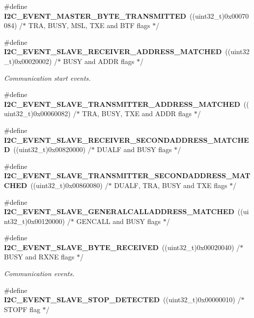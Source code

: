 \begin{DoxyCompactItemize}
\item 
\#define \textbf{ I2\+C\+\_\+\+E\+V\+E\+N\+T\+\_\+\+M\+A\+S\+T\+E\+R\+\_\+\+B\+Y\+T\+E\+\_\+\+T\+R\+A\+N\+S\+M\+I\+T\+T\+ED}~((uint32\+\_\+t)0x00070084)  /$\ast$ T\+R\+A, B\+U\+S\+Y, M\+S\+L, T\+X\+E and B\+T\+F flags $\ast$/
\item 
\#define \textbf{ I2\+C\+\_\+\+E\+V\+E\+N\+T\+\_\+\+S\+L\+A\+V\+E\+\_\+\+R\+E\+C\+E\+I\+V\+E\+R\+\_\+\+A\+D\+D\+R\+E\+S\+S\+\_\+\+M\+A\+T\+C\+H\+ED}~((uint32\+\_\+t)0x00020002) /$\ast$ B\+U\+S\+Y and A\+D\+D\+R flags $\ast$/
\begin{DoxyCompactList}\small\item\em Communication start events. \end{DoxyCompactList}\item 
\#define \textbf{ I2\+C\+\_\+\+E\+V\+E\+N\+T\+\_\+\+S\+L\+A\+V\+E\+\_\+\+T\+R\+A\+N\+S\+M\+I\+T\+T\+E\+R\+\_\+\+A\+D\+D\+R\+E\+S\+S\+\_\+\+M\+A\+T\+C\+H\+ED}~((uint32\+\_\+t)0x00060082) /$\ast$ T\+R\+A, B\+U\+S\+Y, T\+X\+E and A\+D\+D\+R flags $\ast$/
\item 
\#define \textbf{ I2\+C\+\_\+\+E\+V\+E\+N\+T\+\_\+\+S\+L\+A\+V\+E\+\_\+\+R\+E\+C\+E\+I\+V\+E\+R\+\_\+\+S\+E\+C\+O\+N\+D\+A\+D\+D\+R\+E\+S\+S\+\_\+\+M\+A\+T\+C\+H\+ED}~((uint32\+\_\+t)0x00820000)  /$\ast$ D\+U\+A\+L\+F and B\+U\+S\+Y flags $\ast$/
\item 
\#define \textbf{ I2\+C\+\_\+\+E\+V\+E\+N\+T\+\_\+\+S\+L\+A\+V\+E\+\_\+\+T\+R\+A\+N\+S\+M\+I\+T\+T\+E\+R\+\_\+\+S\+E\+C\+O\+N\+D\+A\+D\+D\+R\+E\+S\+S\+\_\+\+M\+A\+T\+C\+H\+ED}~((uint32\+\_\+t)0x00860080)  /$\ast$ D\+U\+A\+L\+F, T\+R\+A, B\+U\+S\+Y and T\+X\+E flags $\ast$/
\item 
\#define \textbf{ I2\+C\+\_\+\+E\+V\+E\+N\+T\+\_\+\+S\+L\+A\+V\+E\+\_\+\+G\+E\+N\+E\+R\+A\+L\+C\+A\+L\+L\+A\+D\+D\+R\+E\+S\+S\+\_\+\+M\+A\+T\+C\+H\+ED}~((uint32\+\_\+t)0x00120000)  /$\ast$ G\+E\+N\+C\+A\+L\+L and B\+U\+S\+Y flags $\ast$/
\item 
\#define \textbf{ I2\+C\+\_\+\+E\+V\+E\+N\+T\+\_\+\+S\+L\+A\+V\+E\+\_\+\+B\+Y\+T\+E\+\_\+\+R\+E\+C\+E\+I\+V\+ED}~((uint32\+\_\+t)0x00020040)  /$\ast$ B\+U\+S\+Y and R\+X\+N\+E flags $\ast$/
\begin{DoxyCompactList}\small\item\em Communication events. \end{DoxyCompactList}\item 
\#define \textbf{ I2\+C\+\_\+\+E\+V\+E\+N\+T\+\_\+\+S\+L\+A\+V\+E\+\_\+\+S\+T\+O\+P\+\_\+\+D\+E\+T\+E\+C\+T\+ED}~((uint32\+\_\+t)0x00000010)  /$\ast$ S\+T\+O\+P\+F flag $\ast$/

\end{DoxyCompactItemize}
